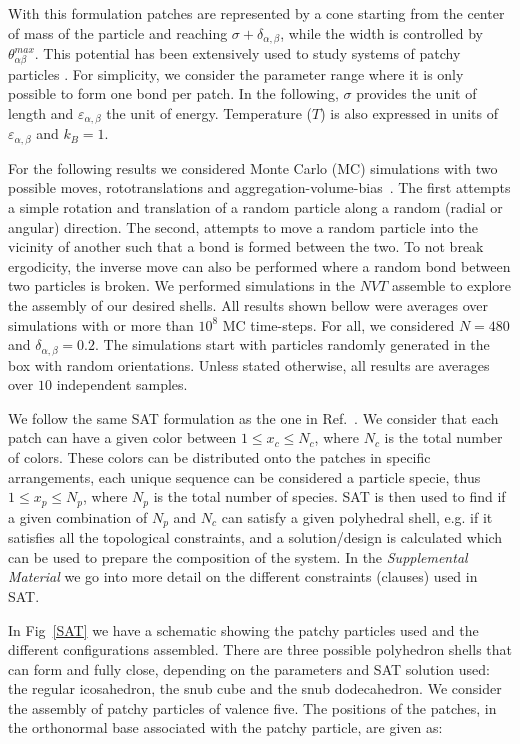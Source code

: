 \documentclass[a4paper, amsfonts, amssymb, amsmath, reprint, showkeys, nofootinbib, twoside]{revtex4-1}
\begin{document}
With this formulation patches are represented by a cone starting from the center of mass of the particle and reaching $\sigma + \delta_{\alpha,\beta}$, while the width is controlled by $\theta^{max}_{\alpha \beta}$. This potential has been extensively used to study systems of patchy particles \cite{Rovigatti2018}. For simplicity, we consider the parameter range where it is only possible to form one bond per patch. In the following, $\sigma$ provides the unit of length and $\varepsilon_{\alpha, \beta}$ the unit of energy. Temperature ($T$) is also expressed in units of $\varepsilon_{\alpha, \beta}$ and $k_B=1$.

For the following results we considered Monte Carlo (MC) simulations with two possible moves, rototranslations and aggregation-volume-bias~\cite{Rovigatti2018}. The first attempts a simple rotation and translation of a random particle along a random (radial or angular) direction. The second, attempts to move a random particle into the vicinity of another such that a bond is formed between the two. To not break ergodicity, the inverse move can also be performed where a random bond between two particles is broken. We performed simulations in the $NVT$ assemble to explore the assembly of our desired shells. All results shown bellow were averages over simulations with or more than $10^8$ MC time-steps. For all, we considered $N=480$ and $\delta_{\alpha, \beta}=0.2$. The simulations start with particles randomly generated in the box with random orientations. Unless stated otherwise, all results are averages over $10$ independent samples.

We follow the same SAT formulation as the one in Ref.~\cite{Russo2022}. We consider that each patch can have a given color between $1\leq x_c\leq N_c$, where $N_c$ is the total number of colors. These colors can be distributed onto the patches in specific arrangements, each unique sequence can be considered a particle specie, thus $1\leq x_p\leq N_p$, where $N_p$ is the total number of species. SAT is then used to find if a given combination of $N_p$ and $N_c$ can satisfy a given polyhedral shell, e.g. if it satisfies all the topological constraints, and a solution/design is calculated which can be used to prepare the composition of the system. In the \emph{Supplemental Material} we go into more detail on the different constraints (clauses) used in SAT.

In Fig~\ref{SAT} we have a schematic showing the patchy particles used and the different configurations assembled. There are three possible polyhedron shells that can form and fully close, depending on the parameters and SAT solution used: the regular icosahedron, the snub cube and the snub dodecahedron. We consider the assembly of patchy particles of valence five. The positions of the patches, in the orthonormal base associated with the patchy particle, are given as:
\end{document}
